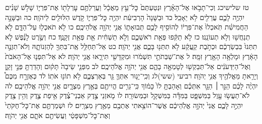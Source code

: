 \documentclass[twoside, openany, parskip=half, 11pt]{book}
\begin{document}
טז שלישיכג וְכִי־תָבֹ֣אוּ אֶל־הָאָ֗רֶץ וּנְטַעְתֶּם֙ כׇּל־עֵ֣ץ מַאֲכָ֔ל וַעֲרַלְתֶּ֥ם עׇרְלָת֖וֹ אֶת־פִּרְי֑וֹ שָׁלֹ֣שׁ שָׁנִ֗ים יִהְיֶ֥ה לָכֶ֛ם עֲרֵלִ֖ים לֹ֥א יֵאָכֵֽל׃ כד וּבַשָּׁנָה֙ הָרְבִיעִ֔ת יִהְיֶ֖ה כׇּל־פִּרְי֑וֹ קֹ֥דֶשׁ הִלּוּלִ֖ים לַיהֹוָֽה׃ כה וּבַשָּׁנָ֣ה הַחֲמִישִׁ֗ת תֹּֽאכְלוּ֙ אֶת־פִּרְי֔וֹ לְהוֹסִ֥יף לָכֶ֖ם תְּבוּאָת֑וֹ אֲנִ֖י יְהֹוָ֥ה אֱלֹהֵיכֶֽם׃ כו לֹ֥א תֹאכְל֖וּ עַל־הַדָּ֑ם לֹ֥א תְנַחֲשׁ֖וּ וְלֹ֥א תְעוֹנֵֽנוּ׃ כז לֹ֣א תַקִּ֔פוּ פְּאַ֖ת רֹאשְׁכֶ֑ם וְלֹ֣א תַשְׁחִ֔ית אֵ֖ת פְּאַ֥ת זְקָנֶֽךָ׃ כח וְשֶׂ֣רֶט לָנֶ֗פֶשׁ לֹ֤א תִתְּנוּ֙ בִּבְשַׂרְכֶ֔ם וּכְתֹ֣בֶת קַֽעֲקַ֔ע לֹ֥א תִתְּנ֖וּ בָּכֶ֑ם אֲנִ֖י יְהֹוָֽה׃ כט אַל־תְּחַלֵּ֥ל אֶֽת־בִּתְּךָ֖ לְהַזְנוֹתָ֑הּ וְלֹא־תִזְנֶ֣ה הָאָ֔רֶץ וּמָלְאָ֥ה הָאָ֖רֶץ זִמָּֽה׃ ל אֶת־שַׁבְּתֹתַ֣י תִּשְׁמֹ֔רוּ וּמִקְדָּשִׁ֖י תִּירָ֑אוּ אֲנִ֖י יְהֹוָֽה׃ לא אַל־תִּפְנ֤וּ אֶל־הָאֹבֹת֙ וְאֶל־הַיִּדְּעֹנִ֔ים אַל־תְּבַקְשׁ֖וּ לְטׇמְאָ֣ה בָהֶ֑ם אֲנִ֖י יְהֹוָ֥ה אֱלֹהֵיכֶֽם׃ לב מִפְּנֵ֤י שֵׂיבָה֙ תָּק֔וּם וְהָדַרְתָּ֖ פְּנֵ֣י זָקֵ֑ן וְיָרֵ֥אתָ מֵּאֱלֹהֶ֖יךָ אֲנִ֥י יְהֹוָֽה׃
רביעי (ששי)לג וְכִֽי־יָג֧וּר אִתְּךָ֛ גֵּ֖ר בְּאַרְצְכֶ֑ם לֹ֥א תוֹנ֖וּ אֹתֽוֹ׃ לד כְּאֶזְרָ֣ח מִכֶּם֩ יִהְיֶ֨ה לָכֶ֜ם הַגֵּ֣ר ׀ הַגָּ֣ר אִתְּכֶ֗ם וְאָהַבְתָּ֥ לוֹ֙ כָּמ֔וֹךָ כִּֽי־גֵרִ֥ים הֱיִיתֶ֖ם בְּאֶ֣רֶץ מִצְרָ֑יִם אֲנִ֖י יְהֹוָ֥ה אֱלֹהֵיכֶֽם׃ לה לֹא־תַעֲשׂ֥וּ עָ֖וֶל בַּמִּשְׁפָּ֑ט בַּמִּדָּ֕ה בַּמִּשְׁקָ֖ל וּבַמְּשׂוּרָֽה׃ לו מֹ֧אזְנֵי צֶ֣דֶק אַבְנֵי־צֶ֗דֶק אֵ֥יפַת צֶ֛דֶק וְהִ֥ין צֶ֖דֶק יִהְיֶ֣ה לָכֶ֑ם אֲנִי֙ יְהֹוָ֣ה אֱלֹֽהֵיכֶ֔ם אֲשֶׁר־הוֹצֵ֥אתִי אֶתְכֶ֖ם מֵאֶ֥רֶץ מִצְרָֽיִם׃ לז וּשְׁמַרְתֶּ֤ם אֶת־כׇּל־חֻקֹּתַי֙ וְאֶת־כׇּל־מִשְׁפָּטַ֔י וַעֲשִׂיתֶ֖ם אֹתָ֑ם אֲנִ֖י יְהֹוָֽה׃
\end{document}
